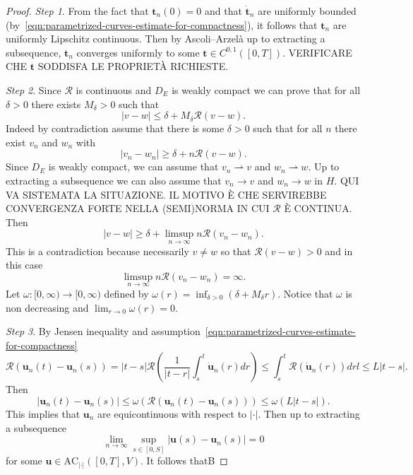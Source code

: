 \begin{proof}
\emph{Step 1}. From the fact that $\boldsymbol{t}_n(0)=0$ and that $\dot{\boldsymbol{t}}_n$ are uniformly bounded (by~\eqref{eqn:parametrized-curves-estimate-for-compactness}), it follows that $\boldsymbol{t}_n$ are uniformly Lipschitz continuous. Then by Ascoli--Arzelà up to extracting a subsequence, $\boldsymbol{t}_n$ converges uniformly to some $\boldsymbol{t}\in C^{0,1}([0,T])$. VERIFICARE CHE $\boldsymbol{t}$ SODDISFA LE PROPRIETÀ RICHIESTE. 

\emph{Step 2}. Since $\mathcal{R}$ is continuous and $D_E$ is weakly compact we can prove that for all $\delta>0$ there exists $M_\delta>0$ such that
\[
|v-w|\le\delta+M_\delta\mathcal{R}(v-w).
\]
Indeed by contradiction assume that there is some $\delta>0$ such that for all $n$ there exist $v_n$ and $w_n$ with
\[
|v_n-w_n|\ge\delta+n\mathcal{R}(v-w).
\]
Since $D_E$ is weakly compact, we can assume that $v_n\rightharpoonup v$ and $w_n\rightharpoonup w$. Up to extracting a subsequence we can also assume that $v_n\to v$ and $w_n\to w$ in $H$. QUI VA SISTEMATA LA SITUAZIONE. IL MOTIVO È CHE SERVIREBBE CONVERGENZA FORTE NELLA (SEMI)NORMA IN CUI $\mathcal{R}$ È CONTINUA. Then
\[
|v-w|\ge\delta+\limsup_{n\to\infty}n\mathcal{R}(v_n-w_n).
\]
This is a contradiction because necessarily $v\neq w$ so that $\mathcal{R}(v-w)>0$ and in this case
\[
\limsup_{n\to\infty}n\mathcal{R}(v_n-w_n)=\infty.
\]
Let $\omega\colon[0,\infty)\to[0,\infty)$ defined by $\omega(r)=\inf_{\delta>0}\left(\delta+M_\delta r\right)$. Notice that $\omega$ is non decreasing and  $\lim_{r\to0}\omega(r)=0$.

\emph{Step 3}. By Jensen inequality and assumption~\eqref{eqn:parametrized-curves-estimate-for-compactness}
\[
\mathcal{R}(\boldsymbol{u}_n(t)-\boldsymbol{u}_n(s))=|t-s|\mathcal{R}\left(\frac{1}{|t-r|}\int_s^t\dot{\boldsymbol{u}}_n(r)dr\right)\le\int_s^t\mathcal{R}(\dot{\boldsymbol{u}}_n(r))drl\le L|t-s|.
\]
Then
\[
|\boldsymbol{u}_n(t)-\boldsymbol{u}_n(s)|\le\omega(\mathcal{R}(\boldsymbol{u}_n(t)-\boldsymbol{u}_n(s)))\le\omega(L|t-s|).
\]
This implies that $\boldsymbol{u}_n$ are equicontinuous with respect to $|\cdot|$. Then up to extracting a subsequence
\[
\lim_{n\to\infty}\sup_{s\in[0,S]}|\boldsymbol{u}(s)-\boldsymbol{u}_n(s)|=0
\]
for some $\boldsymbol{u}\in\text{AC}_{|\cdot|}([0,T],V)$. It follows thatB
\end{proof}

